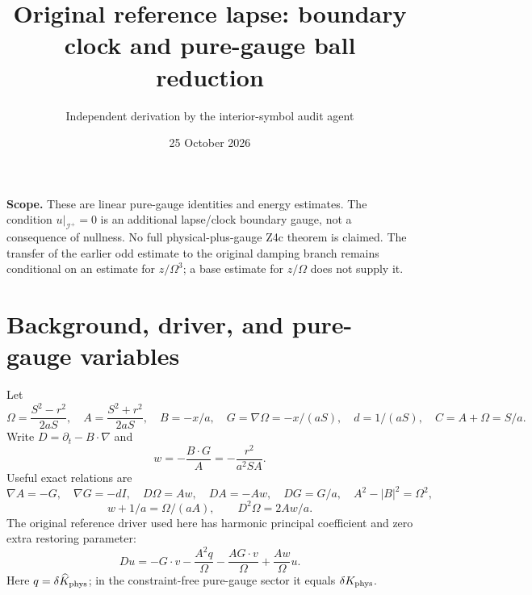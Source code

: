 \documentclass[11pt]{article}
\title{Original reference lapse: boundary clock and pure-gauge ball reduction}
\author{Independent derivation by the interior-symbol audit agent}
\date{25 October 2026}
\newcommand{\scri}{\mathscr I^+}
\begin{document}
\maketitle
\noindent\textbf{Scope.} These are linear pure-gauge identities and energy estimates. The condition $u|_{\scri}=0$ is an additional lapse/clock boundary gauge, not a consequence of nullness. No full physical-plus-gauge Z4c theorem is claimed. The transfer of the earlier odd estimate to the original damping branch remains conditional on an estimate for $z/\Omega^3$; a base estimate for $z/\Omega$ does not supply it.

\section{Background, driver, and pure-gauge variables}
Let
\[
 \Omega=\frac{S^2-r^2}{2aS},\quad A=\frac{S^2+r^2}{2aS},\quad
 B=-x/a,\quad G=\nabla\Omega=-x/(aS),\quad d=1/(aS),\quad C=A+\Omega=S/a.
\]
Write $D=\partial_t-B\cdot\nabla$ and
\[
 w=-\frac{B\cdot G}{A}=-\frac{r^2}{a^2SA}.
\]
Useful exact relations are
\[
 \nabla A=-G,\quad \nabla G=-dI,\quad D\Omega=Aw,\quad DA=-Aw,
 \quad DG=G/a,\quad A^2-|B|^2=\Omega^2,
\]
\[
 w+1/a=\Omega/(aA),\qquad D^2\Omega=2Aw/a.
\]
The original reference driver used here has harmonic principal coefficient and zero extra restoring parameter:
\begin{equation}
 Du=-G\cdot v-\frac{A^2q}{\Omega}-\frac{AG\cdot v}{\Omega}
       +\frac{Aw}{\Omega}u.\label{driver}
\end{equation}
Here $q=\delta\widehat K_{\rm phys}$; in the constraint-free pure-gauge sector it equals $\delta K_{\rm phys}$.
\end{document}
